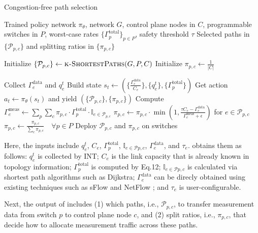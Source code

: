 \begin{algorithm}[t]
\caption{Congestion-free path selection}
\begin{algorithmic}[1]
\Require Trained policy network $\pi_\theta$, network $G$, 
         control plane nodes in $C$, programmable switches in $P$, 
         worst-case rates $\{\Gamma_p^{\text{total}}\}_{p \in P}$, 
         safety threshold $\tau$
\Ensure Selected paths in $\{\mathcal{P}_{p,c}\}$ and splitting ratios in $\{\pi_{p,c}\}$

\State Initialize $\{\mathcal{P}_{p,c}\} \gets \textsc{k-ShortestPaths}(G, P, C)$ %
\State Initialize $\pi_{p,c} \gets \frac{1}{|C|}$ 

\Loop {}
  \State Collect $\Gamma_e^{\text{data}}$ and $q_e^t$
  \State Build state $s_t \gets \left( \{ \frac{\Gamma_e^{\text{data}}}{C_e} \}, \{q_e^t\}, \{\Gamma_p^{\text{total}}\} \right)$
  \State Get action $a_t \gets \pi_\theta(s_t)$ and yield $(\{\mathcal{P}_{p,c}\}, \{\pi_{p,c}\})$ 
  \State Compute $\Gamma_e^{\text{meas}} \gets \sum_{p} \sum_{c} \pi_{p,c} \cdot \Gamma_p^{\text{total}} \cdot \mathbb{I}_{e \in \mathcal{P}_{p,c}}$
  \State $\pi_{p,c} \gets \pi_{p,c} \cdot \min\left(1, \frac{\tau C_e - \Gamma_e^{\text{data}}}{\Gamma_e^{\text{meas}} + \epsilon}\right)$ for $e \in \mathcal{P}_{p,c}$
  \State $\pi_{p,c} \gets \frac{\pi_{p,c}}{\sum_c \pi_{p,c}} \quad \forall p \in P$ 
  \State Deploy $\mathcal{P}_{p,c}$ and $\pi_{p,c}$ on switches
\EndLoop
\end{algorithmic}
\end{algorithm}

Here, the inputs include $q_e^t$, $C_e$, $\Gamma_p^{\text{total}}$, $\mathbb{I}_{e \in \mathcal{P}{p,c}}$, $\Gamma_e^{\text{data}}$, and $\tau_e$. \sysname obtains them as follows: $q_e^t$ is collected by INT; $C_e$ is the link capacity that is already known in topology information; $\Gamma_p^{\text{total}}$ is computed by Eq.12; $\mathbb{I}_{e \in \mathcal{P}{p,c}}$ is calculated via shortest path algorithms such as Dijkstra; $\Gamma_e^{\text{data}}$ can be direcly obtained using existing techniques such as sFlow \cite{sFlow} and NetFlow \cite{netflow}; and $\tau_e$ is user-configurable. 

Next, the output of \sysname includes (1) which paths, i.e., $\mathcal{P}_{p,c}$, to transfer measurement data from switch $p$ to control plane node $c$, and (2) split ratios, i.e., $\pi_{p,c}$, that decide how to allocate measurement traffic across these paths. 

